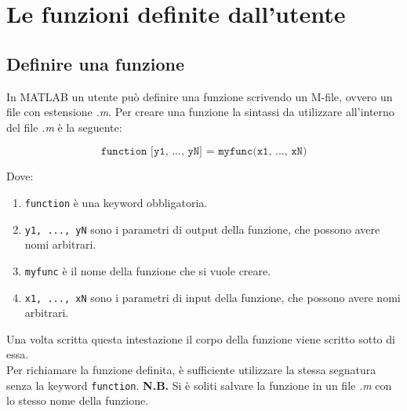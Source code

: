\chapter{Le funzioni definite dall'utente}
\section{Definire una funzione}
In MATLAB un utente può definire una funzione scrivendo un M-file, ovvero un file con estensione \textit{.m}.
Per creare una funzione la sintassi da utilizzare all'interno del file \textit{.m} è la seguente:

$$  \texttt{function [y1, ..., yN] = myfunc(x1, ..., xN)}$$

Dove:
\begin{enumerate}
	\item	\texttt{function} è una keyword obbligatoria.
	\item	\texttt{y1, ..., yN} sono i parametri di output della funzione, che possono avere nomi arbitrari.
	\item 	\texttt{myfunc} è il nome della funzione che si vuole creare.
	\item	\texttt{x1, ..., xN} sono i parametri di input della funzione, che possono avere nomi arbitrari. 
\end{enumerate}

Una volta scritta questa intestazione il corpo della funzione viene scritto sotto di essa. \\
Per richiamare la funzione definita, è sufficiente utilizzare la stessa segnatura senza la keyword \texttt{function}. 
\break \break
\textbf{N.B.} Si è soliti salvare la funzione in un file \textit{.m} con lo stesso nome della funzione.